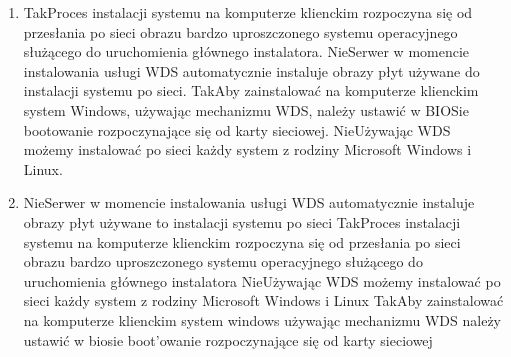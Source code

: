 \begin{enumerate}
		\newpage
		\item {}%
		{Tak}{Proces instalacji systemu na komputerze klienckim rozpoczyna się od przesłania po sieci obrazu bardzo uproszczonego systemu operacyjnego służącego do uruchomienia głównego instalatora.}%
		{Nie}{Serwer w momencie instalowania usługi WDS automatycznie instaluje obrazy płyt używane do instalacji systemu po sieci.}%
		{Tak}{Aby zainstalować na komputerze klienckim system Windows, używając mechanizmu WDS, należy ustawić w BIOSie bootowanie rozpoczynające się od karty sieciowej.}%
		{Nie}{Używając WDS możemy instalować po sieci każdy system z rodziny Microsoft Windows i Linux.}
		\item {}%
		{Nie}{Serwer w momencie instalowania usługi WDS automatycznie instaluje obrazy płyt używane to instalacji systemu po sieci}%
		{Tak}{Proces instalacji systemu na komputerze klienckim rozpoczyna się od przesłania po sieci obrazu bardzo uproszczonego systemu operacyjnego służącego do uruchomienia głównego instalatora}%
		{Nie}{Używając WDS możemy instalować po sieci każdy system z rodziny Microsoft Windows i Linux}%
		{Tak}{Aby zainstalować na komputerze klienckim system windows używając mechanizmu WDS należy ustawić w biosie boot'owanie rozpoczynające się od karty sieciowej}

				
		
	\end{enumerate}